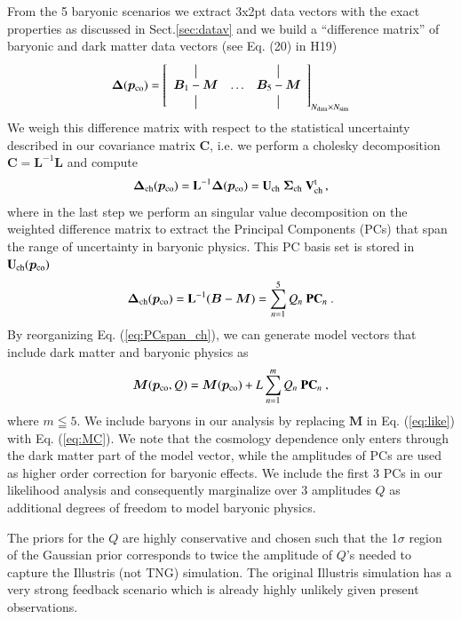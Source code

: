 \documentclass[fleqn,usenatbib,useAMS]{mnras}
\newcommand{\be}{\begin{equation}}
\newcommand{\ee}{\end{equation}}
\newcommand*{\vertbar}{\rule[-1ex]{0.5pt}{2.5ex}}
\newcommand{\U}{\mathbf U}
\newcommand{\V}{\mathbf V}
\renewcommand{\t}{\rm t}
\newcommand{\M}{\bm M}
\newcommand{\B}{\bm B}
\newcommand{\C}{\mathbf C}
\newcommand{\invL}{\mathbf L^{-1}}
\renewcommand{\L}{\mathbf L}
\newcommand{\pco}{\bm p_{\rm co}}
\begin{document}
From the 5 baryonic scenarios we extract 3x2pt data vectors with the exact properties as discussed in Sect.\ref{sec:datav} and we build a ``difference matrix''  of baryonic and dark matter data vectors (see Eq. (20) in H19) 
\be 
\label{eq:DiffMatrix_chy}
\begin{aligned}
{\bm \Delta}(\pco) &= 
\left[
  \begin{array}{cccc}
    \vertbar  &        & \vertbar \\
    \B_{\rm 1}-\M    & \ldots & \B_{\rm 5}-\M_{\rm}    \\
    \vertbar  &        & \vertbar 
  \end{array}
\right]_{N_{\rm data} \times N_{\rm sim}} \\
 \end{aligned}
\ee 
We weigh this difference matrix with respect to the statistical uncertainty described in our covariance matrix $\C$, i.e. we perform a cholesky decomposition $\C=\invL \L$ and compute
\be 
 {\bm \Delta_{\rm ch}}(\pco)=\invL {\bm \Delta}(\pco) = \U_{\rm ch} \ \bm \Sigma_{\rm ch}\ \V_{\rm ch}^{\t} \,,
\ee 
where in the last step we perform an singular value decomposition on the weighted difference matrix to extract the Principal Components (PCs) that span the range of uncertainty in baryonic physics. This PC basis set is stored in $\U_{\rm ch}(\pco)$
\begin{equation} \label{eq:PCspan_ch}
{\bm \Delta_{\rm ch}}(\pco)= \invL (\B - \M)  =  \sum_{n = 1}^{5} Q_n\ {\mathbf {PC}}_n \ .
\end{equation}
By reorganizing Eq. (\ref{eq:PCspan_ch}), we can generate model vectors that include dark matter and baryonic physics as 
\be 
\label{eq:MC}
\M(\pco, Q ) = \M(\pco) + L \sum_{n = 1}^{m} Q_n\ {\mathbf {PC}}_n \ , 
\ee
where $m \leqq 5$. We include baryons in our analysis by replacing $\M$ in Eq. (\ref{eq:like}) with Eq. (\ref{eq:MC}). We note that the cosmology dependence only enters through the dark matter part of the model vector, while the amplitudes of PCs are used as higher order correction for baryonic effects. We include the first 3 PCs in our likelihood analysis and consequently marginalize over 3 amplitudes $Q$ as additional degrees of freedom to model baryonic physics.   

The priors for the $Q$ are highly conservative and chosen such that the 1$\sigma$ region of the Gaussian prior corresponds to twice the amplitude of $Q$'s needed to capture the Illustris (not TNG) simulation. The original Illustris simulation has a very strong feedback scenario which is already highly unlikely given present observations. 
\end{document}
